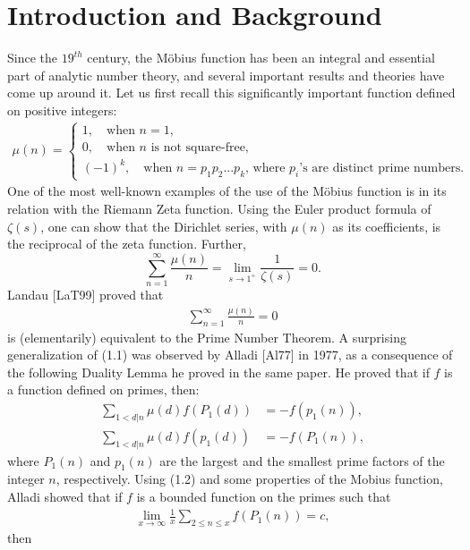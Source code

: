 \documentclass[12pt]{article}
\numberwithin{equation}{section}
\numberwithin{equation}{section}
\begin{document}
\section{Introduction and Background}
Since the $19^{th}$ century, the M\"obius function has been an integral and essential part of analytic number theory, and several important results and theories have come up around it. Let us first recall this significantly  important function defined on positive integers:
\begin{align}
    \mu(n) = \begin{cases}
        1,\quad \text{when $n=1$}, \\
        0,\quad \text{when $n$ is not square-free}, \\
        (-1)^k,\quad \text{when $n=p_1p_2...p_k$, where $p_i$'s are distinct prime numbers.}
    \end{cases} \nonumber
\end{align}
One of the most well-known examples of the use of the M\"obius function is in its relation with the Riemann Zeta function. Using the Euler product formula of $\zeta(s)$, one can show that the Dirichlet series, with $\mu(n)$ as its coefficients, is the reciprocal of the zeta function. Further, 
\begin{equation}
    \sum_{n=1}^{\infty}\frac{\mu(n)}{n} = \lim_{s\to 1^+}\frac{1}{\zeta(s)} = 0. \nonumber
\end{equation}
Landau [LaT99] proved that 
\begin{align}
    \sum_{n=1}^{\infty}\frac{\mu(n)}{n} = 0
\end{align}
is (elementarily) equivalent to the Prime Number Theorem. A surprising generalization of (1.1) was observed by Alladi [Al77] in 1977, as a consequence of the following Duality Lemma he proved in the same paper. He proved that if $f$ is a function defined on primes, then:
\begin{align}
    \sum_{1<d|n}\mu(d)f(P_1(d)) &= -f(p_1(n)), \nonumber \\
    \sum_{1<d|n} \mu(d)f(p_1(d)) &= -f(P_1(n)),
\end{align}
where $P_1(n)$ and $p_1(n)$ are the largest and the smallest prime factors of the integer $n$, respectively. Using (1.2) and some properties of the Mobius function, Alladi showed that if $f$ is a bounded function on the primes such that
\begin{align}
    \lim_{x\to \infty}\frac{1}{x}\sum_{2\leq n\leq x}f(P_1(n)) = c,    
\end{align}
then 
\end{document}
